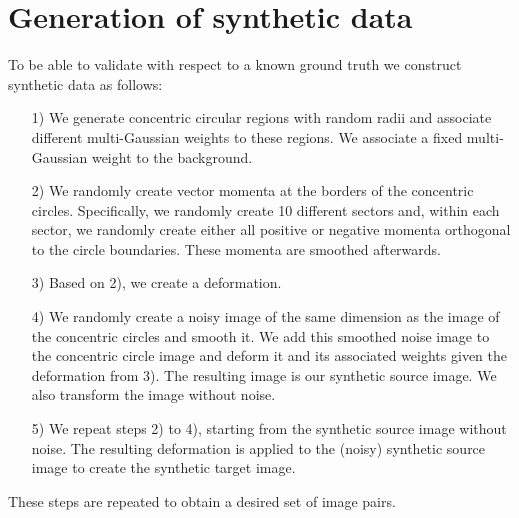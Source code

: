 \documentclass[10pt,twocolumn,letterpaper,table]{article}
\numberwithin{equation}{section}
\theoremstyle{plain}
\theoremstyle{definition}
\begin{document}
\section{Generation of synthetic data}
\label{sec:synthetic_experiment_setup}

To be able to validate with respect to a known ground truth we construct synthetic data as follows:
\begin{itemize}
\item[1)] We generate concentric circular regions with random radii and associate different multi-Gaussian weights to these regions. We associate a fixed multi-Gaussian weight to the background.
\item[2)] We randomly create vector momenta at the borders of the concentric circles. Specifically, we randomly create 10 different sectors and, within each sector, we randomly create either all positive or negative momenta orthogonal to the circle boundaries. These momenta are smoothed afterwards. 
\item[3)] Based on 2), we create a deformation.
\item[4)] We randomly create a noisy image of the same dimension as the image of the concentric circles and smooth it. We add this smoothed noise image to the concentric circle image and deform it and its associated weights given the deformation from 3). The resulting image is our synthetic source image. We also transform the image without noise.
\item[5)] We repeat steps 2) to 4), starting from the synthetic source image without noise. The resulting deformation is applied to the (noisy) synthetic source image to create the synthetic target image.
\end{itemize}
These steps are repeated to obtain a desired set of image pairs.
\end{document}
